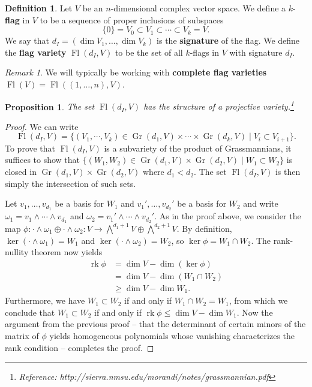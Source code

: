 \documentclass{article}
\theoremstyle{plain}
\newtheorem{proposition}[theorem]{Proposition}
\theoremstyle{definition}
\newtheorem{definition}[theorem]{Definition}
\theoremstyle{remark}
\newtheorem*{remark}{Remark}
\DeclareMathOperator{\Gr}{Gr}
\DeclareMathOperator{\Fl}{Fl}
\DeclareMathOperator{\rk}{rk}
\begin{document}
\begin{definition}
    Let $V$ be an $n$-dimensional complex vector space. We define a $k$-\textbf{flag}
    in $V$ to be a sequence of proper inclusions of subspaces
    \[\{0\}=V_0 \subset V_1 \subset \cdots \subset V_k=V.\]
    We say that $d_I=(\dim V_1,\ldots,\dim V_k)$ is the \textbf{signature} of the flag.
    We define the \textbf{flag variety} $\Fl(d_I,V)$ to be the set of all $k$-flags in $V$ with signature $d_I$.
\end{definition}

\begin{remark}
    We will typically be working with \textbf{complete flag varieties} $\Fl(V)=\Fl( (1,\ldots,n), V)$.
\end{remark}

\begin{proposition}
    The set $\Fl(d_I,V)$ has the structure of a projective variety.\footnote{Reference: http://sierra.nmsu.edu/morandi/notes/grassmannian.pdf}
\end{proposition}
\begin{proof}
    We can write
    \[\Fl(d_I,V)=\{(V_1, \cdots,V_k)\in\Gr(d_1,V)\times\cdots\times\Gr(d_k,V) \mid V_{i}\subset V_{i+1}\}.\]
    To prove that $\Fl(d_I,V)$ is a subvariety of the product of Grassmannians,
    it suffices to show that $\{(W_1,W_2)\in\Gr(d_1,V)\times\Gr(d_2,V) \mid W_1\subset W_2\}$ is closed
    in $\Gr(d_1,V)\times\Gr(d_2,V)$ where $d_1<d_2$. The set $\Fl(d_I,V)$ is then simply the intersection
    of such sets.
    
    Let $v_1,\ldots, v_{d_1}$ be a basis for $W_1$
    and $v_1',\ldots, v_{d_2}'$ be a basis for $W_2$ and write $\omega_1=v_1\wedge\cdots\wedge v_{d_1}$
    and $\omega_2=v_1'\wedge\cdots\wedge v_{d_2}'$. As in the proof above, we consider the map
    $\phi:\cdot\wedge\omega_1\oplus\cdot\wedge\omega_2:V\to \bigwedge^{d_1+1}V\oplus\bigwedge^{d_2+1}V$.
    By definition, $\ker(\cdot\wedge\omega_1)=W_1$ and $\ker(\cdot\wedge\omega_2)=W_2$, so
    $\ker\phi=W_1\cap W_2$. The rank-nullity theorem now yields
    \begin{align*}
        \rk\phi &= \dim V - \dim\left( \ker\phi \right)\\
        &= \dim V - \dim(W_1\cap W_2)\\
        &\geqslant \dim V - \dim W_1.
    \end{align*}
    Furthermore, we have $W_1\subset W_2$ if and only if $W_1\cap W_2=W_1$, from which we conclude that
    $W_1\subset W_2$ if and only if $\rk\phi\leqslant\dim V-\dim W_1$. Now the argument
    from the previous proof -- that the determinant of certain minors of the matrix of $\phi$ yields
    homogeneous polynomials whose vanishing characterizes the rank condition -- completes
    the proof.
\end{proof}
\end{document}
